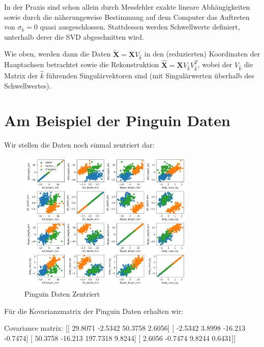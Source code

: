 \documentclass[]{book}
\newenvironment{Shaded}{\begin{snugshade}}{\end{snugshade}}
\newcommand{\FloatTok}[1]{\textcolor[rgb]{0.00,0.00,0.81}{#1}}
\newcommand{\NormalTok}[1]{#1}
\theoremstyle{definition}
\theoremstyle{definition}
\theoremstyle{definition}
\theoremstyle{definition}
\theoremstyle{remark}
\begin{document}
In der Praxis sind schon allein durch Messfehler exakte lineare Abhängigkeiten sowie durch die näherungsweise Bestimmung auf dem Computer das Auftreten von \(\sigma_k =0\) quasi ausgeschlossen. Stattdessen werden Schwellwerte definiert, unterhalb derer die SVD abgeschnitten wird.

Wie oben, werden dann die Daten \(\tilde {\mathbf{X}}={\mathbf{X}}V_{\hat k}\) in den (reduzierten) Koordinaten der Hauptachsen betrachtet sowie die Rekonstruktion \(\hat {\mathbf{X}}= {\mathbf{X}}V_{\hat k}V_{\hat k}^T\), wobei der \(V_{\hat k}\) die Matrix der \(\hat k\) führenden Singulärvektoren sind (mit Singulärwerten überhalb des Schwellwertes).

\hypertarget{am-beispiel-der-pinguin-daten}{%
\section{Am Beispiel der Pinguin Daten}\label{am-beispiel-der-pinguin-daten}}

Wir stellen die Daten noch einmal zentriert dar:

\begin{figure}
\hypertarget{fig:05-penguin-allpairs-cntrd}{%
\centering
\includegraphics[width=0.75\textwidth,height=\textheight]{bilder/05-all-pairs-cntrd.png}
\caption{Pinguin Daten Zentriert}\label{fig:05-penguin-allpairs-cntrd}
}
\end{figure}

Für die Kovarianzmatrix der Pinguin Daten erhalten wir:

\begin{Shaded}
\begin{Highlighting}[]
\NormalTok{Covariance matrix: }
\NormalTok{[[ }\FloatTok{29.8071}  \FloatTok{-2.5342}  \FloatTok{50.3758}   \FloatTok{2.6056}\NormalTok{]}
\NormalTok{ [ }\FloatTok{-2.5342}   \FloatTok{3.8998} \FloatTok{-16.213}   \FloatTok{-0.7474}\NormalTok{]}
\NormalTok{ [ }\FloatTok{50.3758} \FloatTok{-16.213}  \FloatTok{197.7318}   \FloatTok{9.8244}\NormalTok{]}
\NormalTok{ [  }\FloatTok{2.6056}  \FloatTok{-0.7474}   \FloatTok{9.8244}   \FloatTok{0.6431}\NormalTok{]]}
\end{Highlighting}
\end{Shaded}
\end{document}
